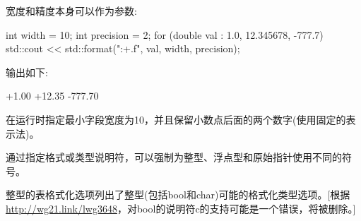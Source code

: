 宽度和精度本身可以作为参数:

\begin{cpp}
int width = 10;
int precision = 2;
for (double val : {1.0, 12.345678, -777.7}) {
	std::cout << std::format("{:+{}.{}f}\n", val, width, precision);
}
\end{cpp}

输出如下:

\begin{shell}
    +1.00
   +12.35
  -777.70
\end{shell}

在运行时指定最小字段宽度为10，并且保留小数点后面的两个数字(使用固定的表示法)。


通过指定格式或类型说明符，可以强制为整型、浮点型和原始指针使用不同的符号。


整型的表格式化选项列出了整型(包括bool和char)可能的格式化类型选项。[根据\url{http://wg21.link/lwg3648}，对bool的说明符c的支持可能是一个错误，将被删除。]

